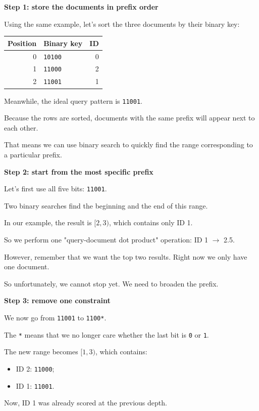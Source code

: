 \textbf{Step 1: store the documents in prefix order}\par
Using the same example, let's sort the three documents by their binary key:
\begin{center}
\begin{tabular}{@{}rlr@{}}\toprule
Position & Binary key & ID\\\midrule
0 & \texttt{10100} & 0\\
1 & \texttt{11000} & 2\\
2 & \texttt{11001} & 1\\\bottomrule
\end{tabular}
\end{center}
Meanwhile, the ideal query pattern is \texttt{11001}.

Because the rows are sorted, documents with the same prefix will appear next to each other.

That means we can use binary search to quickly find the range corresponding to a particular prefix.

\textbf{Step 2: start from the most specific prefix}\par
Let's first use all five bits: \texttt{11001}.

Two binary searches find the beginning and the end of this range.

In our example, the result is $[2,3)$, which contains only ID 1.

So we perform one "query-document dot product" operation: ID 1 $\to$ 2.5.

However, remember that we want the top two results. Right now we only have one document.

So unfortunately, we cannot stop yet. We need to broaden the prefix.

\textbf{Step 3: remove one constraint}\par
We now go from \texttt{11001} to \texttt{1100*}.

The \texttt{*} means that we no longer care whether the last bit is \texttt{0} or \texttt{1}.

The new range becomes $[1,3)$, which contains:
\begin{itemize}\setlength{\itemsep}{1pt}
\item ID 2: \texttt{11000};
\item ID 1: \texttt{11001}.
\end{itemize}
Now, ID 1 was already scored at the previous depth.

